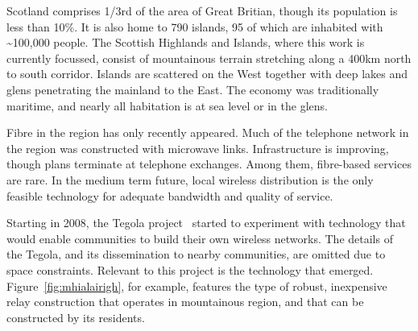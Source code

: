 
Scotland comprises 1/3rd of the area of Great Britian, though its population is
less than 10\%. It is also home to 790 islands, 95 of which are inhabited with
\textasciitilde 100,000 people. The Scottish Highlands and Islands, where this
work is currently focussed, consist of mountainous terrain stretching along a
400km north to south corridor. Islands are scattered on the West together with
deep lakes and glens penetrating the mainland to the East.  The economy was
traditionally maritime, and nearly all habitation is at sea level or in the
glens.

Fibre in the region has only recently appeared.  Much of the telephone network
in the region was constructed with microwave links. Infrastructure is improving,
though plans terminate at telephone exchanges. Among them, fibre-based
services are rare. In the medium term future, local wireless distribution is the
only feasible technology for adequate bandwidth and quality of service.

Starting in 2008, the Tegola project~\cite{tegola} started to
experiment with technology that would enable communities to build
their own wireless networks.
The details of the Tegola, and its dissemination to nearby communities, are
omitted due to space constraints. Relevant to this project is the technology
that emerged. Figure~\ref{fig:mhialairigh}, for example, features the type of
robust, inexpensive relay construction that operates in mountainous region, and
that can be constructed by its residents.

